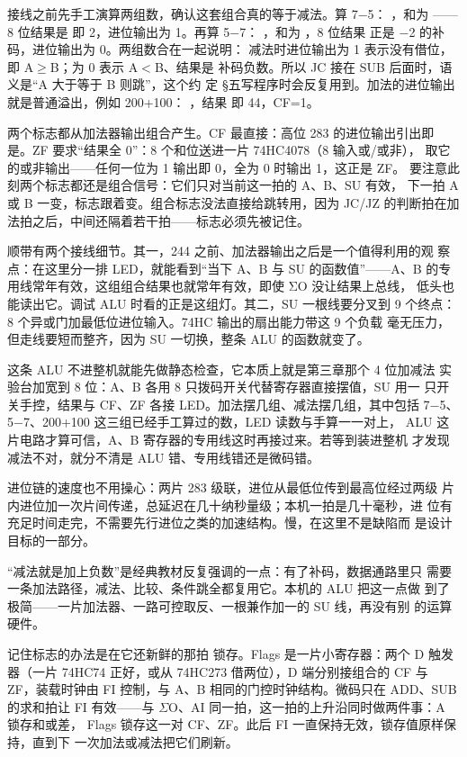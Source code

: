 接线之前先手工演算两组数，确认这套组合真的等于减法。算 7$-$5：
，和为 ——8 位结果是
 即 2，进位输出为 1。再算 5$-$7：
，和为 ，8 位结果
 正是 $-$2 的补码，进位输出为 0。两组数合在一起说明：
减法时进位输出为 1 表示没有借位，即 A$\geq$B；为 0 表示 A$<$B、结果是
补码负数。所以 JC 接在 SUB 后面时，语义是“A 大于等于 B 则跳”，这个约
定 §五写程序时会反复用到。加法的进位输出就是普通溢出，例如 200+100：
，结果  即 44，CF=1。

两个标志都从加法器输出组合产生。CF 最直接：高位 283 的进位输出引出即
是。ZF 要求“结果全 0”：8 个和位送进一片 74HC4078（8 输入或/或非），
取它的或非输出——任何一位为 1 输出即 0，全为 0 时输出 1，这正是 ZF。
要注意此刻两个标志都还是组合信号：它们只对当前这一拍的 A、B、SU 有效，
下一拍 A 或 B 一变，标志跟着变。组合标志没法直接给跳转用，因为 JC/JZ
的判断拍在加法拍之后，中间还隔着若干拍——标志必须先被记住。

顺带有两个接线细节。其一，244 之前、加法器输出之后是一个值得利用的观
察点：在这里分一排 LED，就能看到“当下 A、B 与 SU 的函数值”——A、B
的专用线常年有效，这组组合结果也就常年有效，即使 ΣO 没让结果上总线，
低头也能读出它。调试 ALU 时看的正是这组灯。其二，SU 一根线要分叉到 9
个终点：8 个异或门加最低位进位输入。74HC 输出的扇出能力带这 9 个负载
毫无压力，但走线要短而整齐，因为 SU 一切换，整条 ALU 的函数就变了。

这条 ALU 不进整机就能先做静态检查，它本质上就是第三章那个 4 位加减法
实验台加宽到 8 位：A、B 各用 8 只拨码开关代替寄存器直接摆值，SU 用一
只开关手控，结果与 CF、ZF 各接 LED。加法摆几组、减法摆几组，其中包括
7$-$5、5$-$7、200+100 这三组已经手工算过的数，LED 读数与手算一一对上，
ALU 这片电路才算可信，A、B 寄存器的专用线这时再接过来。若等到装进整机
才发现减法不对，就分不清是 ALU 错、专用线错还是微码错。

进位链的速度也不用操心：两片 283 级联，进位从最低位传到最高位经过两级
片内进位加一次片间传递，总延迟在几十纳秒量级；本机一拍是几十毫秒，进
位有充足时间走完，不需要先行进位之类的加速结构。慢，在这里不是缺陷而
是设计目标的一部分。

\begin{classicnote}
“减法就是加上负数”是经典教材反复强调的一点：有了补码，数据通路里只
需要一条加法路径，减法、比较、条件跳全都复用它。本机的 ALU 把这一点做
到了极简——一片加法器、一路可控取反、一根兼作加一的 SU 线，再没有别
的运算硬件。
\end{classicnote}

记住标志的办法是在它还新鲜的那拍
锁存。Flags 是一片小寄存器：两个 D 触发器（一片 74HC74 正好，或从
74HC273 借两位），D 端分别接组合的 CF 与 ZF，装载时钟由 FI 控制，与
A、B 相同的门控时钟结构。微码只在 ADD、SUB 的求和拍让 FI 有效——与
$\Sigma$O、AI 同一拍，这一拍的上升沿同时做两件事：A 锁存和或差，
Flags 锁存这一对 CF、ZF。此后 FI 一直保持无效，锁存值原样保持，直到下
一次加法或减法把它们刷新。

